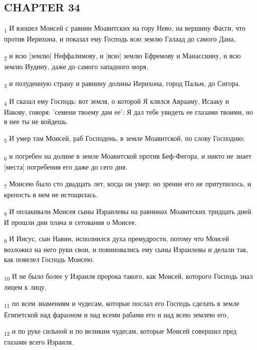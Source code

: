 \subsection{CHAPTER 34}
\begin{tcolorbox}
\textsubscript{1} И взошел Моисей с равнин Моавитских на гору Нево, на вершину Фасги, что против Иерихона, и показал ему Господь всю землю Галаад до самого Дана,
\end{tcolorbox}
\begin{tcolorbox}
\textsubscript{2} и всю [землю] Неффалимову, и [всю] землю Ефремову и Манассиину, и всю землю Иудину, даже до самого западного моря,
\end{tcolorbox}
\begin{tcolorbox}
\textsubscript{3} и полуденную страну и равнину долины Иерихона, город Пальм, до Сигора.
\end{tcolorbox}
\begin{tcolorbox}
\textsubscript{4} И сказал ему Господь: вот земля, о которой Я клялся Аврааму, Исааку и Иакову, говоря: 'семени твоему дам ее'; Я дал тебе увидеть ее глазами твоими, но в нее ты не войдешь.
\end{tcolorbox}
\begin{tcolorbox}
\textsubscript{5} И умер там Моисей, раб Господень, в земле Моавитской, по слову Господню;
\end{tcolorbox}
\begin{tcolorbox}
\textsubscript{6} и погребен на долине в земле Моавитской против Беф-Фегора, и никто не знает [места] погребения его даже до сего дня.
\end{tcolorbox}
\begin{tcolorbox}
\textsubscript{7} Моисею было сто двадцать лет, когда он умер; но зрение его не притупилось, и крепость в нем не истощилась.
\end{tcolorbox}
\begin{tcolorbox}
\textsubscript{8} И оплакивали Моисея сыны Израилевы на равнинах Моавитских тридцать дней. И прошли дни плача и сетования о Моисее.
\end{tcolorbox}
\begin{tcolorbox}
\textsubscript{9} И Иисус, сын Навин, исполнился духа премудрости, потому что Моисей возложил на него руки свои, и повиновались ему сыны Израилевы и делали так, как повелел Господь Моисею.
\end{tcolorbox}
\begin{tcolorbox}
\textsubscript{10} И не было более у Израиля пророка такого, как Моисей, которого Господь знал лицем к лицу,
\end{tcolorbox}
\begin{tcolorbox}
\textsubscript{11} по всем знамениям и чудесам, которые послал его Господь сделать в земле Египетской над фараоном и над всеми рабами его и над всею землею его,
\end{tcolorbox}
\begin{tcolorbox}
\textsubscript{12} и по руке сильной и по великим чудесам, которые Моисей совершил пред глазами всего Израиля.
\end{tcolorbox}
